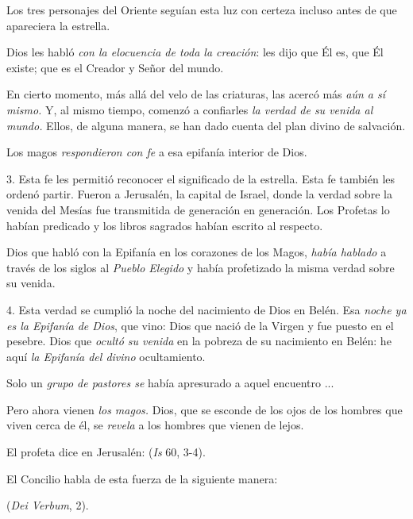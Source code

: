 \begin{body}
	Los tres personajes del Oriente seguían esta luz con certeza incluso antes de que apareciera la estrella.
	
	Dios les habló \emph{con la elocuencia de toda la creación}: les dijo que Él es, que Él existe; que es el Creador y Señor del mundo.
	
	En cierto momento, más allá del velo de las criaturas, las acercó más \emph{aún a sí mismo.} Y, al mismo tiempo, comenzó a confiarles \emph{la verdad de su venida al mundo.} Ellos, de alguna manera, se han dado cuenta del plan divino de salvación.
	
	Los magos \emph{respondieron con fe} a esa epifanía interior de Dios.
	
	3. Esta fe les permitió reconocer el significado de la estrella. Esta fe también les ordenó partir. Fueron a Jerusalén, la capital de Israel, donde la verdad sobre la venida del Mesías fue transmitida de generación en generación. Los Profetas lo habían predicado y los libros sagrados habían escrito al respecto.
	
	Dios que habló con la Epifanía en los corazones de los Magos, \emph{había hablado} a través de los siglos al \emph{Pueblo Elegido} y había profetizado la misma verdad sobre su venida.
	
	4. Esta verdad se cumplió la noche del nacimiento de Dios en Belén. Esa \emph{noche ya es la Epifanía de Dios}, que vino: Dios que nació de la Virgen y fue puesto en el pesebre. Dios que \emph{ocultó su venida} en la pobreza de su nacimiento en Belén: he aquí \emph{la Epifanía del divino} ocultamiento.
	
	Solo un \emph{grupo de pastores se} había apresurado a aquel encuentro ...
	
	Pero ahora vienen \emph{los magos.} Dios, que se esconde de los ojos de los hombres que viven cerca de él, se \emph{revela} a los hombres que vienen de lejos.
	
	El profeta dice en Jerusalén:  (\emph{Is} 60, 3-4).
	
	El Concilio habla de esta fuerza de la siguiente manera:
	
	 (\emph{Dei Verbum}, 2).
	

\end{body}

